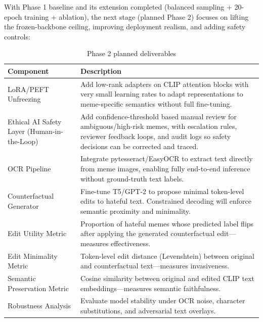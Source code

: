 \documentclass[12pt,a4paper]{article}
\begin{document}
With Phase 1 baseline and its extension completed (balanced sampling + 20-epoch training + ablation), the next stage (planned Phase 2) focuses on lifting the frozen-backbone ceiling, improving deployment realism, and adding safety controls:

\begin{table}[H]
  \centering
  \caption{Phase 2 planned deliverables}
  \renewcommand{\arraystretch}{1.35}
  \begin{tabularx}{\textwidth}{lX}
    \toprule
    \rowcolor{primaryblue!15}
    \textbf{Component} & \textbf{Description} \\
    \midrule
    LoRA/PEFT Unfreezing &
      Add low-rank adapters on CLIP attention blocks with very small learning rates to adapt representations to meme-specific semantics without full fine-tuning. \\
    Ethical AI Safety Layer (Human-in-the-Loop) &
      Add confidence-threshold based manual review for ambiguous/high-risk memes, with escalation rules, reviewer feedback loops, and audit logs so safety decisions can be corrected and traced. \\
    OCR Pipeline &
      Integrate pytesseract/EasyOCR to extract text directly from meme images, enabling fully end-to-end inference without ground-truth text labels. \\
    Counterfactual Generator &
      Fine-tune T5/GPT-2 to propose minimal token-level edits to hateful text. Constrained decoding will enforce semantic proximity and minimality. \\
    Edit Utility Metric &
      Proportion of hateful memes whose predicted label flips after applying the generated counterfactual edit---measures effectiveness. \\
    Edit Minimality Metric &
      Token-level edit distance (Levenshtein) between original and counterfactual text---measures invasiveness. \\
    Semantic Preservation Metric &
      Cosine similarity between original and edited CLIP text embeddings---measures semantic faithfulness. \\
    Robustness Analysis &
      Evaluate model stability under OCR noise, character substitutions, and adversarial text overlays. \\
    \bottomrule
  \end{tabularx}
  \label{tab:phase2}
\end{table}

\end{document}
